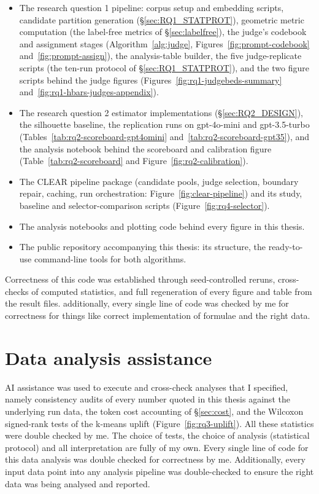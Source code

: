 \documentclass[11pt,a4paper,oneside]{report}
\begin{document}
\begin{itemize}
\item The research question 1 pipeline: corpus setup and embedding scripts,
candidate partition generation (\S\ref{sec:RQ1_STATPROT}), geometric metric computation
(the label-free metrics of \S\ref{sec:labelfree}), the judge's
codebook and assignment stages (Algorithm~\ref{alg:judge}, Figures~\ref{fig:prompt-codebook}
and~\ref{fig:prompt-assign}), the analysis-table builder, the five
judge-replicate scripts (the ten-run protocol of \S\ref{sec:RQ1_STATPROT}), and the two
figure scripts behind the judge figures (Figures~\ref{fig:rq1-judgebeds-summary}
and~\ref{fig:rq1-hbars-judges-appendix}).
\item The research question 2 estimator implementations (\S\ref{sec:RQ2_DESIGN}), the silhouette
baseline, the replication runs on {\small\ttfamily gpt-4o-mini} and
{\small\ttfamily gpt-3.5-turbo} (Tables~\ref{tab:rq2-scoreboard-gpt4omini}
and~\ref{tab:rq2-scoreboard-gpt35}), and the analysis notebook behind the
scoreboard and calibration figure (Table~\ref{tab:rq2-scoreboard} and
Figure~\ref{fig:rq2-calibration}).
\item The CLEAR pipeline package (candidate pools, judge selection, boundary
repair, caching, run orchestration: Figure~\ref{fig:clear-pipeline}) and its study, baseline and
selector-comparison scripts (Figure~\ref{fig:rq4-selector}).
\item The analysis notebooks and plotting code behind every figure in this
thesis.
\item The public repository accompanying this thesis: its structure, the
ready-to-use command-line tools for both algorithms.
\end{itemize}

Correctness of this code was
established through seed-controlled reruns, cross-checks of computed
statistics, and full regeneration of
every figure and table from the result files. additionally, every single line of code was checked by me for correctness for things like correct implementation of formulae and the right data.

\section*{Data analysis assistance}

AI assistance was used to execute and cross-check analyses that I specified,
namely consistency audits of every number quoted in this thesis against the
underlying run data, the token cost accounting of \S\ref{sec:cost}, and the
Wilcoxon signed-rank tests of the k-means uplift (Figure~\ref{fig:rq3-uplift}). All these statistics were double checked by me. The choice of tests, the choice of analysis (statistical protocol) and all
interpretation are fully of my own. Every single line of code for this data analysis was double checked for correctness by me. Additionally, every input data point into any analysis pipeline was double-checked to ensure the right data was being analysed and reported.
\end{document}
